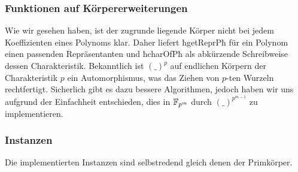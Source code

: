 \subsubsection{Funktionen auf Körpererweiterungen}
Wie wir gesehen haben, ist der zugrunde liegende Körper nicht bei jedem
Koeffizienten eines Polynoms klar. Daher liefert ħgetReprPħ für ein Polynom
einen passenden Repräsentanten und ħcharOfPħ als abkürzende Schreibweise dessen
Charakteristik.
Bekanntlich ist $(\_)^p$ auf endlichen Körpern der Charakteristik $p$ 
ein Automorphismus, was das Ziehen von $p$-ten Wurzeln rechtfertigt.
Sicherlich gibt es dazu bessere Algorithmen, jedoch haben wir uns aufgrund der
Einfachheit entschieden, dies in $\mathbb{F}_{p^m}$ durch $(\_)^{p^{m-1}}$ zu
implementieren.

\subsubsection{Instanzen}
Die implementierten Instanzen sind selbstredend gleich denen der Primkörper.


